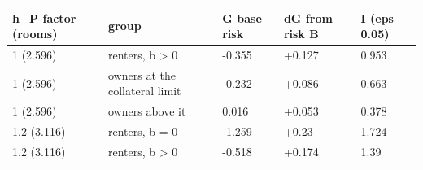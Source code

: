 \begingroup\small
\setlength{\tabcolsep}{3pt}
\renewcommand{\arraystretch}{1.04}
\begin{tabularx}{\linewidth}{XXXXX}
\toprule
h\_P factor (rooms) & group & G base risk & dG from risk B & I (eps 0.05) \\
\midrule
1 (2.596) & renters, b \textgreater{} 0 & -0.355 & +0.127 & 0.953 \\
1 (2.596) & owners at the collateral limit & -0.232 & +0.086 & 0.663 \\
1 (2.596) & owners above it & 0.016 & +0.053 & 0.378 \\
1.2 (3.116) & renters, b = 0 & -1.259 & +0.23 & 1.724 \\
1.2 (3.116) & renters, b \textgreater{} 0 & -0.518 & +0.174 & 1.39 \\
\bottomrule
\end{tabularx}
\endgroup

